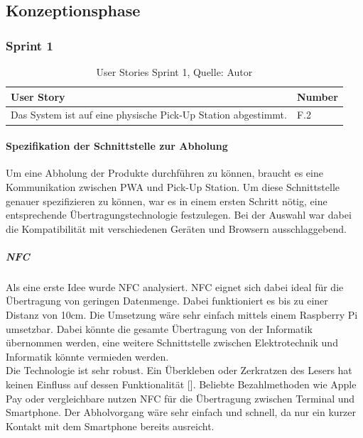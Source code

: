 \newpage
\subsection{Konzeptionsphase}
\subsubsection{Sprint 1}\label{Sprint1}
\begin{table}[H]
	\begin{tabularx}{\textwidth}{|l|X|}
		\hline
		User Story & Number \\
		\hline
		Das System ist auf eine physische Pick-Up Station abgestimmt. & F.2\\
		\hline
	\end{tabularx} 
\caption[User Stories Sprint 1]{User Stories Sprint 1, Quelle: Autor}
\end{table}\label{userStoriesSprint1}

\paragraph{Spezifikation der Schnittstelle zur Abholung}\label{SpezifikationSchnittstelleAbholung}
Um eine Abholung der Produkte durchführen zu können, braucht es eine Kommunikation zwischen  \gls{PWA} und Pick-Up Station. Um diese Schnittstelle genauer spezifizieren zu können, war es in einem ersten Schritt nötig, eine entsprechende Übertragungstechnologie festzulegen. Bei der Auswahl war dabei die Kompatibilität mit verschiedenen Geräten und Browsern ausschlaggebend. 
\subparagraph{NFC}
Als eine erste Idee wurde \ac{NFC} analysiert. \ac{NFC} eignet sich dabei ideal für die Übertragung von geringen Datenmenge. Dabei funktioniert es bis zu einer Distanz von 10cm. Die Umsetzung wäre sehr einfach mittels einem Raspberry Pi umsetzbar. Dabei könnte die gesamte Übertragung von der Informatik übernommen werden, eine weitere Schnittstelle zwischen Elektrotechnik und Informatik könnte vermieden werden.  \\Die Technologie ist sehr robust. Ein Überkleben oder Zerkratzen des Lesers hat keinen Einfluss auf dessen Funktionalität  [\cite{nfc}]. Beliebte Bezahlmethoden wie Apple Pay oder vergleichbare nutzen \ac{NFC} für die Übertragung zwischen Terminal und Smartphone. 
Der Abholvorgang wäre sehr einfach und schnell, da nur ein kurzer Kontakt mit dem Smartphone bereits ausreicht. \\\\

